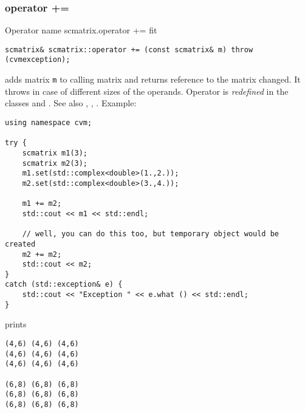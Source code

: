 \subsubsection{operator +=}
Operator%
\pdfdest name {scmatrix.operator +=} fit
\begin{verbatim}
scmatrix& scmatrix::operator += (const scmatrix& m) throw (cvmexception);
\end{verbatim}
adds  matrix \verb"m" to  calling matrix 
and returns  reference to
the matrix changed.
It throws  
in case of different sizes of the operands.
Operator is \emph{redefined} in the classes
and .
See also ,
,
.
Example:
\begin{Verbatim}
using namespace cvm;

try {
    scmatrix m1(3);
    scmatrix m2(3);
    m1.set(std::complex<double>(1.,2.));
    m2.set(std::complex<double>(3.,4.));

    m1 += m2;
    std::cout << m1 << std::endl;

    // well, you can do this too, but temporary object would be created
    m2 += m2; 
    std::cout << m2;
}
catch (std::exception& e) {
    std::cout << "Exception " << e.what () << std::endl;
}
\end{Verbatim}
prints
\begin{Verbatim}
(4,6) (4,6) (4,6)
(4,6) (4,6) (4,6)
(4,6) (4,6) (4,6)

(6,8) (6,8) (6,8)
(6,8) (6,8) (6,8)
(6,8) (6,8) (6,8)
\end{Verbatim}
\newpage




